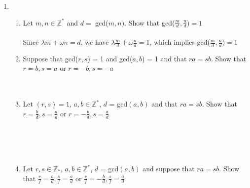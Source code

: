 \documentclass[11pt]{article}
\begin{document}
\begin{enumerate}
\begin{enumerate}
\end{enumerate}


\newpage %
\item 
\begin{enumerate}
\item Let $m,n \in \mathbb{Z}^*$ and $d = $ gcd($m,n)$.  Show that gcd($\tfrac{m}{d} , \tfrac{n}{d}) = 1$
\\\\
Since $\lambda m + \omega n = d$, we have $\lambda \tfrac{m}{d} + \omega \tfrac{n}{d} = 1$, which implies gcd($\tfrac{m}{d} , \tfrac{n}{d}) = 1$
\\
\item Suppose that gcd($r,s$) = 1 and gcd($a,b$) = 1 and that $ra = sb$.  Show that $r=b, s = a$ or $r = -b, s = -a$
\\

\\
\\
\item Let $(r,s) = 1$, $a,b \in \mathbb{Z}^*$, $d$ = gcd$(a,b)$ and that $ra = sb$.  Show that $r = \tfrac{b}{d}, s = \tfrac{a}{d}$ or $r = -\tfrac{b}{d}, s=\tfrac{a}{d}$
\\
\\
\\
\\
\\

\item Let $r,s \in \mathbb{Z}_*$, $a,b \in \mathbb{Z}^*$, $d$ = gcd$(a,b)$ and suppose that $ra = sb$.  Show that $\tfrac{r}{f} = \tfrac{b}{d}, \tfrac{s}{f} = \tfrac{a}{d}$ or $\tfrac{r}{f} = -\tfrac{b}{d}, \tfrac{s}{f}=\tfrac{a}{d}$
\end{enumerate}



\end{enumerate}
\end{document}
